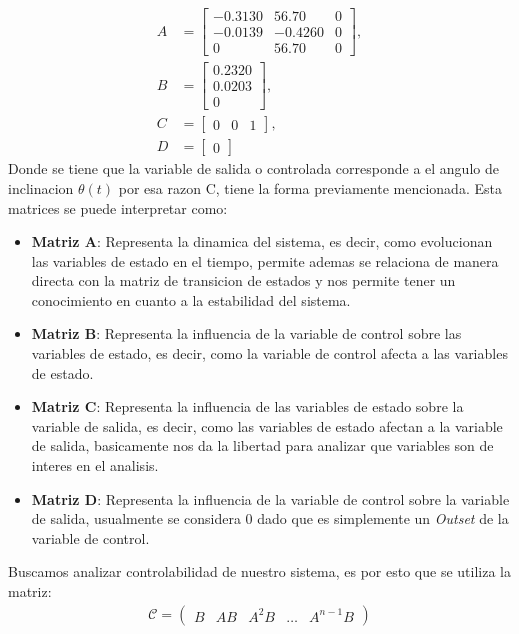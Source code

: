 \begin{itemize}
		\begin{align}
		A &= \begin{bmatrix}
			-0.3130 & 56.70 & 0 \\
			-0.0139 & -0.4260 & 0 \\
			0 & 56.70 & 0
		\end{bmatrix}, \\
		B &= \begin{bmatrix}
			0.2320 \\
			0.0203 \\
			0
		\end{bmatrix}, \\
		C &= \begin{bmatrix}
			0 & 0 & 1
		\end{bmatrix}, \\
		D &= \begin{bmatrix}
			0
		\end{bmatrix}
		\end{align}		
Donde se tiene que la variable de salida o controlada corresponde a el angulo de inclinacion $\theta(t)$ por esa razon C, tiene la forma previamente mencionada. Esta matrices se puede interpretar como:
\begin{itemize}
	\item \textbf{Matriz A}: Representa la dinamica del sistema, es decir, como evolucionan las variables de estado en el tiempo, permite ademas se relaciona de manera directa con la matriz de transicion de estados y nos permite tener un conocimiento en cuanto a la estabilidad del sistema.
	\item \textbf{Matriz B}: Representa la influencia de la variable de control sobre las variables de estado, es decir, como la variable de control afecta a las variables de estado.
	\item \textbf{Matriz C}: Representa la influencia de las variables de estado sobre la variable de salida, es decir, como las variables de estado afectan a la variable de salida, basicamente nos da la libertad para analizar que variables son de interes en el analisis.
	\item \textbf{Matriz D}: Representa la influencia de la variable de control sobre la variable de salida, usualmente se considera 0 dado que es simplemente un \textit{Outset} de la variable de control.
\end{itemize}
Buscamos analizar controlabilidad de nuestro sistema, es por esto que se utiliza la matriz: 
\begin{align}
	\mathcal{C} = \begin{pmatrix} B & AB & A^{2}B & \dots & A^{n-1}B \end{pmatrix}

\end{align}
\end{itemize}
